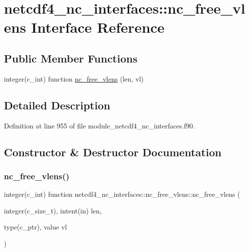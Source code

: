 \hypertarget{interfacenetcdf4__nc__interfaces_1_1nc__free__vlens}{}\section{netcdf4\+\_\+nc\+\_\+interfaces\+:\+:nc\+\_\+free\+\_\+vlens Interface Reference}
\label{interfacenetcdf4__nc__interfaces_1_1nc__free__vlens}
\subsection*{Public Member Functions}
\begin{DoxyCompactItemize}
\item 
integer(c\+\_\+int) function \hyperlink{interfacenetcdf4__nc__interfaces_1_1nc__free__vlens_a16e5aa76ba1cdcc9046baa57a75943af}{nc\+\_\+free\+\_\+vlens} (len, vl)
\end{DoxyCompactItemize}


\subsection{Detailed Description}


Definition at line 955 of file module\+\_\+netcdf4\+\_\+nc\+\_\+interfaces.\+f90.



\subsection{Constructor \& Destructor Documentation}
\mbox{\label{interfacenetcdf4__nc__interfaces_1_1nc__free__vlens_a16e5aa76ba1cdcc9046baa57a75943af}} 
\subsubsection{\texorpdfstring{nc\+\_\+free\+\_\+vlens()}{nc\_free\_vlens()}}
{\footnotesize\ttfamily integer(c\+\_\+int) function netcdf4\+\_\+nc\+\_\+interfaces\+::nc\+\_\+free\+\_\+vlens\+::nc\+\_\+free\+\_\+vlens (\begin{DoxyParamCaption}\item[{integer(c\+\_\+size\+\_\+t), intent(in)}]{len,  }\item[{type(c\+\_\+ptr), value}]{vl }\end{DoxyParamCaption})}



